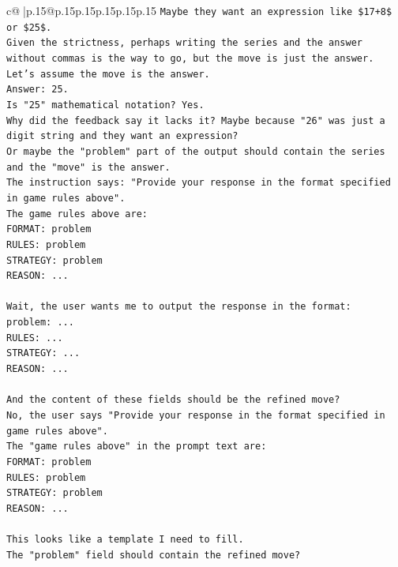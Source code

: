 \documentclass{article}
\begin{document}
{\begin{supertabular}{c@{$\;$}|p{.15\linewidth}@{}p{.15\linewidth}p{.15\linewidth}p{.15\linewidth}p{.15\linewidth}p{.15\linewidth}}
{{{\texttt{Maybe they want an expression like \$17+8\$ or \$25\$.} \\
\texttt{Given the strictness, perhaps writing the series and the answer without commas is the way to go, but the move is just the answer.} \\
\texttt{Let's assume the move is the answer.} \\
\texttt{Answer: 25.} \\
\texttt{Is "25" mathematical notation? Yes.} \\
\texttt{Why did the feedback say it lacks it? Maybe because "26" was just a digit string and they want an expression?} \\
\texttt{Or maybe the "problem" part of the output should contain the series and the "move" is the answer.} \\
\texttt{The instruction says: "Provide your response in the format specified in game rules above".} \\
\texttt{The game rules above are:} \\
\texttt{FORMAT: problem} \\
\texttt{RULES: problem} \\
\texttt{STRATEGY: problem} \\
\texttt{REASON: ...} \\
\\ 
\texttt{Wait, the user wants me to output the response in the format:} \\
\texttt{problem: ...} \\
\texttt{RULES: ...} \\
\texttt{STRATEGY: ...} \\
\texttt{REASON: ...} \\
\\ 
\texttt{And the content of these fields should be the refined move?} \\
\texttt{No, the user says "Provide your response in the format specified in game rules above".} \\
\texttt{The "game rules above" in the prompt text are:} \\
\texttt{FORMAT: problem} \\
\texttt{RULES: problem} \\
\texttt{STRATEGY: problem} \\
\texttt{REASON: ...} \\
\\ 
\texttt{This looks like a template I need to fill.} \\
\texttt{The "problem" field should contain the refined move?} \\
}}}
\end{supertabular}}
\end{document}
